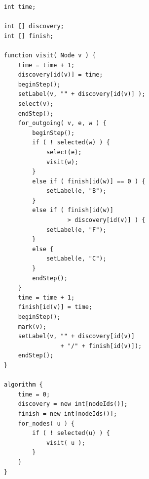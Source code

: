 
\begin{figure}

\begin{minipage}{0.5\textwidth}
\small

\begin{verbatim}
int time;

int [] discovery;
int [] finish;

function visit( Node v ) {
    time = time + 1;
    discovery[id(v)] = time;
    beginStep();
    setLabel(v, "" + discovery[id(v)] );
    select(v);
    endStep();
    for_outgoing( v, e, w ) {
        beginStep();
        if ( ! selected(w) ) {
            select(e);
            visit(w);
        }
        else if ( finish[id(w)] == 0 ) {
            setLabel(e, "B");
        }
        else if ( finish[id(w)] 
                  > discovery[id(v)] ) {
            setLabel(e, "F");
        }
        else {
            setLabel(e, "C");
        }
        endStep();
    }
    time = time + 1;
    finish[id(v)] = time;
    beginStep();
    mark(v);
    setLabel(v, "" + discovery[id(v)]
                + "/" + finish[id(v)]);
    endStep();
}

algorithm {
    time = 0;
    discovery = new int[nodeIds()];
    finish = new int[nodeIds()];
    for_nodes( u ) {
        if ( ! selected(u) ) {
            visit( u );
        }
    }
}
\end{verbatim}


\end{minipage}
\begin{minipage}{0.49\textwidth}
\centering


\end{minipage}
\end{figure}
